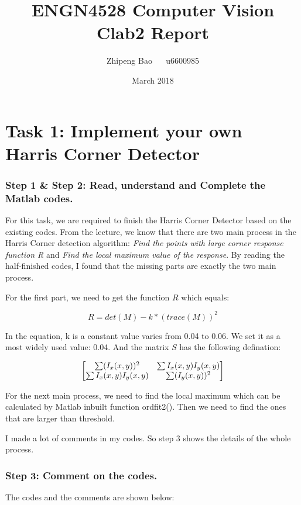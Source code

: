 \documentclass{article}
\title{ENGN4528 Computer Vision Clab2 Report}
\author{Zhipeng Bao ~~ u6600985}
\date{March 2018}
\begin{document}
\maketitle

\section*{Task 1: Implement your own Harris Corner Detector}
\subsubsection*{Step 1 \& Step 2: Read, understand and Complete the Matlab codes.}
For this task, we are required to finish the Harris Corner Detector based on the existing codes. From the lecture, we know that there are two main process in the Harris Corner detection algorithm: \emph{Find the points with large corner response function R} and \emph{Find the local maximum value of the response}. By reading the half-finished codes, I found that the missing parts are exactly the two main process.

For the first part, we need to get the function $R$ which equals:

\begin{equation}
    R = det(M)-k*(trace(M))^2
\end{equation}

In the equation, k is a constant value varies from 0.04 to 0.06. We set it as a most widely used value: 0.04. And the matrix $S$ has the following defination:

\[
\centering
\begin{bmatrix}
    \sum (I_x(x,y))^2 & \sum I_x(x,y)I_y(x,y) \\
    \sum I_x(x,y)I_y(x,y) & \sum (I_y(x,y))^2
\end{bmatrix}
\]

For the next main process, we need to find the local maximum which can be calculated by Matlab inbuilt function ordfit2(). Then we need to find the ones that are larger than threshold.

I made a lot of comments in my codes. So step 3 shows the details of the whole process.

\subsubsection*{Step 3: Comment on the codes.}
The codes and the comments are shown below:
\end{document}
